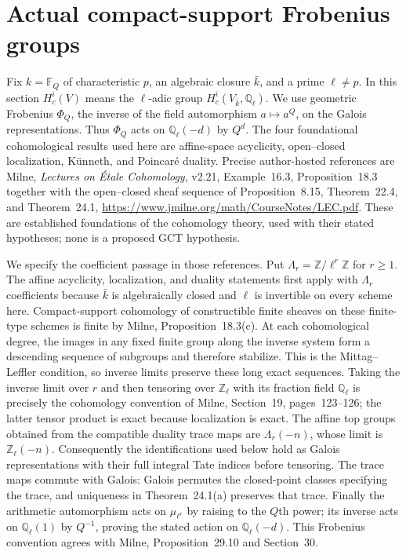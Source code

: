 \section{Actual compact-support Frobenius groups}
\label{sec:cg-cohomology}
Fix $k=\mathbb F_Q$ of characteristic $p$, an algebraic closure
$\bar k$, and a prime $\ell\ne p$. In this section $H^i_c(V)$ means
the $\ell$-adic group $H^i_c(V_{\bar k},\mathbb Q_\ell)$.
We use geometric Frobenius $\Phi_Q$, the inverse of the field
automorphism $a\mapsto a^Q$, on the Galois representations.
Thus $\Phi_Q$ acts on $\mathbb Q_\ell(-d)$ by $Q^d$.
The four foundational cohomological results used here are affine-space
acyclicity, open--closed localization, K\"unneth, and Poincar\'e duality.
Precise author-hosted references are Milne, \emph{Lectures on \'Etale
Cohomology}, v2.21, Example~16.3, Proposition~18.3 together with the
open--closed sheaf sequence of Proposition~8.15, Theorem~22.4,
and Theorem~24.1,
\url{https://www.jmilne.org/math/CourseNotes/LEC.pdf}.
These are established foundations of the cohomology theory, used with
their stated hypotheses; none is a proposed GCT hypothesis.

We specify the coefficient passage in those references. Put
$\Lambda_r=\mathbb Z/\ell^r\mathbb Z$ for $r\geq1$.
The affine acyclicity, localization, and duality statements first apply
with $\Lambda_r$ coefficients because $\bar k$ is algebraically closed
and $\ell$ is invertible on every scheme here. Compact-support
cohomology of constructible finite sheaves on these finite-type schemes
is finite by Milne, Proposition~18.3(c). At each cohomological degree,
the images in any fixed finite group along the inverse system form a
descending sequence of subgroups and therefore stabilize. This is the
Mittag--Leffler condition, so inverse limits preserve these long exact
sequences. Taking the inverse limit over $r$ and then tensoring over
$\mathbb Z_\ell$ with its fraction field $\mathbb Q_\ell$ is precisely
the cohomology convention of Milne, Section~19, pages~123--126;
the latter tensor product is exact because localization is exact.
The affine top groups obtained from the compatible duality trace maps
are $\Lambda_r(-n)$, whose limit is $\mathbb Z_\ell(-n)$.
Consequently the identifications used below hold as Galois
representations with their full integral Tate indices before tensoring.
The trace maps commute with Galois: Galois permutes the closed-point
classes specifying the trace, and uniqueness in Theorem~24.1(a)
preserves that trace. Finally the arithmetic automorphism acts on
$\mu_{\ell^r}$ by raising to the $Q$th power; its inverse acts on
$\mathbb Q_\ell(1)$ by $Q^{-1}$, proving the stated action on
$\mathbb Q_\ell(-d)$. This Frobenius convention agrees with
Milne, Proposition~29.10 and Section~30.

